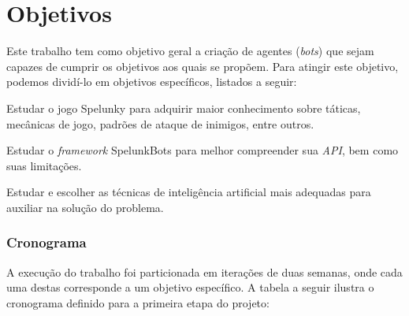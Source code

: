 \chapter{\label{chap:objectives}Objetivos}
Este trabalho tem como objetivo geral a criação de agentes (\textit{bots})
que sejam capazes de cumprir os objetivos aos quais se propõem. Para atingir este objetivo, podemos dividí-lo em objetivos específicos, listados a seguir:

\begin{description}
    \item Estudar o jogo Spelunky para adquirir maior conhecimento sobre táticas, mecânicas de jogo, padrões de ataque de inimigos, entre outros.

    \item Estudar o \textit{framework} SpelunkBots para melhor compreender sua \textit{API}, bem como suas limitações.

    \item Estudar e escolher as técnicas de inteligência artificial mais adequadas para auxiliar na solução do problema.
\end{description}

\subsection{Cronograma}
A execução do trabalho foi particionada em iterações de duas semanas, onde cada uma destas corresponde a um objetivo específico. A tabela a seguir ilustra o cronograma definido para a primeira etapa do projeto:

